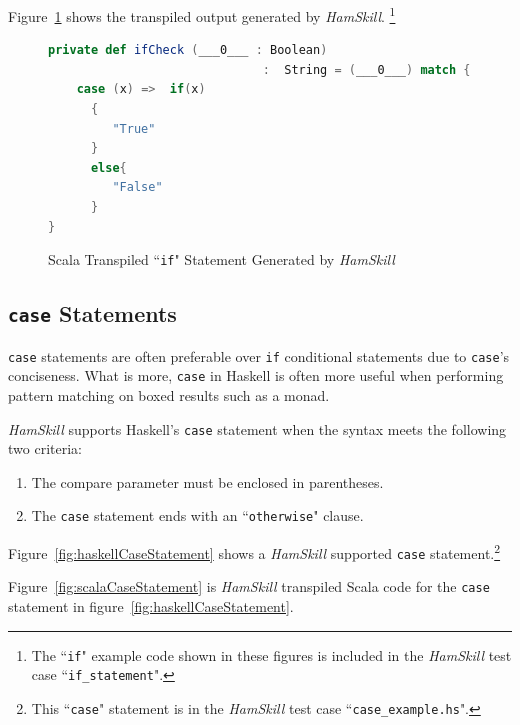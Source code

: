 \documentclass{report}
\begin{document}
Figure~\ref{fig:scalaFunctionIfCheck} shows the transpiled output generated by \textit{HamSkill}. \footnote{The ``\texttt{if}" example code shown in these figures is included in the \textit{HamSkill} test case ``\texttt{if\_statement}".}

\begin{figure}[H]
\begin{mdframed}
\begin{lstlisting}[language=Scala, basicstyle=\small]
private def ifCheck (___0___ : Boolean) 
                              :  String = (___0___) match {
    case (x) =>  if(x)
      {
         "True"
      }
      else{
         "False"
      }
}
\end{lstlisting}
\end{mdframed}
\caption{Scala Transpiled ``\texttt{if}" Statement Generated by \textit{HamSkill}}\label{fig:scalaFunctionIfCheck}
\end{figure}

\subsection{\texttt{case} Statements}

\texttt{case} statements are often preferable over \texttt{if} conditional statements due to \texttt{case}'s conciseness.  What is more, \texttt{case} in Haskell is often more useful when performing pattern matching on boxed results such as a monad.

\textit{HamSkill} supports Haskell's \texttt{case} statement when the syntax meets the following two criteria:

\begin{enumerate}

\item The compare parameter must be enclosed in parentheses.

\item The \texttt{case} statement ends with an ``\texttt{otherwise}" clause.

\end{enumerate}

Figure~\ref{fig:haskellCaseStatement} shows a \textit{HamSkill} supported \texttt{case} statement.\footnote{This ``\texttt{case}" statement is in the \textit{HamSkill} test case ``\texttt{case\_example.hs}".}


Figure~\ref{fig:scalaCaseStatement} is \textit{HamSkill} transpiled Scala code for the \texttt{case} statement in figure~\ref{fig:haskellCaseStatement}.
\end{document}
